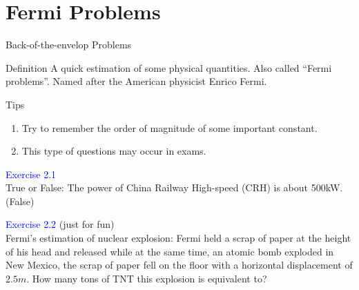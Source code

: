 \documentclass{beamer}
\begin{document}
\section{Fermi Problems}
\begin{frame}{Back-of-the-envelop Problems}
  \begin{block}{Definition}
    A quick estimation of some physical quantities. Also called ``Fermi problems''. Named after the American physicist Enrico Fermi.
  \end{block}
  \begin{block}{Tips}
    \begin{enumerate}
      \item Try to remember the order of magnitude of some important constant.
      \item This type of questions may occur in exams.
    \end{enumerate}
  \end{block}
  \textcolor{blue}{Exercise 2.1}\\
  True or False: The power of China Railway High-speed (CRH) is about 500kW.\\
  (False)\\
\end{frame}

\begin{frame}
  \textcolor{blue}{Exercise 2.2} (just for fun)\\
  Fermi's estimation of nuclear explosion: Fermi held a scrap of paper at the height of his head and released while at the same time, an atomic bomb exploded in New Mexico, the scrap of paper fell on the floor with a horizontal displacement of $2.5m$. How many tons of TNT this explosion is equivalent to?
\end{frame}
\end{document}
